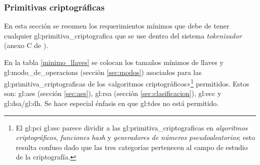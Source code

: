 %
%

\subsubsection{Primitivas criptográficas}

En esta sección se resumen los requerimientos mínimos que debe de tener
cualquier \gls{gl:primitiva_criptografica} que se use dentro del sistema
\textit{tokenizador} (anexo C de \cite{pci_tokens}).

En la tabla \ref{minimo_llaves} se colocan los tamaños mínimos de llaves y
\glspl{gl:modo_de_operacion} (sección \ref{sec:modos}) asociados
para las \glspl{gl:primitiva_criptografica} de los «algoritmos
criptográficos»\footnote{El \gls{gl:pci} \gls{gl:ssc} parece dividir a las
\glspl{gl:primitiva_criptografica} en \textit{algoritmos criptográficos},
\textit{funciones hash} y \textit{generadores de números pseudoaleatorios};
esto resulta confuso dado que las tres categorías pertenecen al campo de
estudio de la criptografía.} permitidos. Estos son: \gls{gl:aes} (sección
\ref{sec:aes}), \gls{gl:rsa} (sección \ref{sec:clasificacion}), \gls{gl:ecc} y
\gls{gl:dsa}/\gls{gl:dh}. Se hace especial énfasis en que \gls{gl:tdes} no
está permitido.



